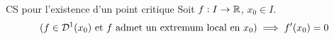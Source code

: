 

\begin{theoreme}{18.13}{CS pour l'existence d'un point critique}
    Soit $f : I\rightarrow\mathbb{R}$, $x_0 \in I$.$$(f \in \mathcal{D}^1({x_0}) \text{ et $f$ admet un extremum local en $x_0$}) \implies f'(x_0) = 0$$
\end{theoreme}
